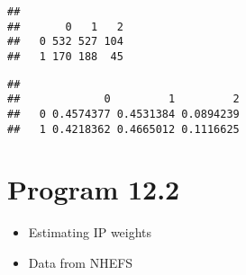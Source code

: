 \documentclass[
  10pt,
]{book}
\newenvironment{Shaded}{\begin{snugshade}}{\end{snugshade}}
\newcommand{\DecValTok}[1]{\textcolor[rgb]{0.00,0.00,0.81}{#1}}
\newcommand{\KeywordTok}[1]{\textcolor[rgb]{0.13,0.29,0.53}{\textbf{#1}}}
\newcommand{\NormalTok}[1]{#1}
\newcommand{\OperatorTok}[1]{\textcolor[rgb]{0.81,0.36,0.00}{\textbf{#1}}}
\providecommand{\tightlist}{%
  \setlength{\itemsep}{0pt}\setlength{\parskip}{0pt}}
\begin{document}
\begin{Shaded}
\end{Shaded}

\begin{verbatim}
##    
##       0   1   2
##   0 532 527 104
##   1 170 188  45
\end{verbatim}

\begin{Shaded}
\end{Shaded}

\begin{verbatim}
##    
##             0         1         2
##   0 0.4574377 0.4531384 0.0894239
##   1 0.4218362 0.4665012 0.1116625
\end{verbatim}

\hypertarget{program-12.2}{%
\section{Program 12.2}\label{program-12.2}}

\begin{itemize}
\tightlist
\item
  Estimating IP weights
\item
  Data from NHEFS
\end{itemize}
\end{document}
